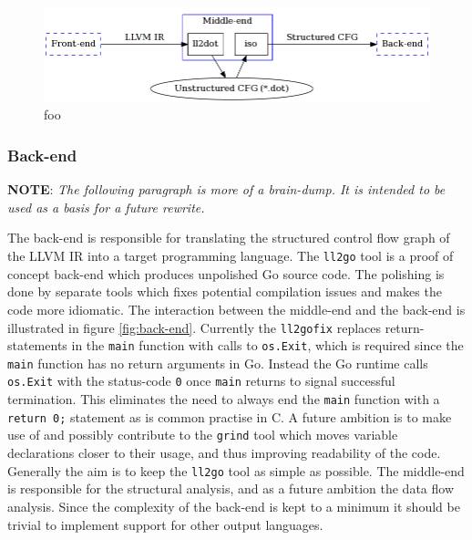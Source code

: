 %

\begin{figure}[htbp]
	\begin{center}
		\includegraphics[width=\textwidth]{inc/middle-end.png}
		\caption{foo}
		\label{fig:middle-end}
	\end{center}
\end{figure}

\subsubsection{Back-end}




\textbf{NOTE}: \textit{The following paragraph is more of a brain-dump. It is intended to be used as a basis for a future rewrite.}

The back-end is responsible for translating the structured control flow graph of the LLVM IR into a target programming language. The \texttt{ll2go} tool is a proof of concept back-end which produces unpolished Go source code. The polishing is done by separate tools which fixes potential compilation issues and makes the code more idiomatic. The interaction between the middle-end and the back-end is illustrated in figure \ref{fig:back-end}. Currently the \texttt{ll2gofix} replaces return-statements in the \texttt{main} function with calls to \texttt{os.Exit}, which is required since the \texttt{main} function has no return arguments in Go. Instead the Go runtime calls \texttt{os.Exit} with the status-code \texttt{0} once \texttt{main} returns to signal successful termination. This eliminates the need to always end the \texttt{main} function with a \texttt{return 0;} statement as is common practise in C. A future ambition is to make use of and possibly contribute to the \texttt{grind} tool which moves variable declarations closer to their usage, and thus improving readability of the code. Generally the aim is to keep the \texttt{ll2go} tool as simple as possible. The middle-end is responsible for the structural analysis, and as a future ambition the data flow analysis. Since the complexity of the back-end is kept to a minimum it should be trivial to implement support for other output languages.

